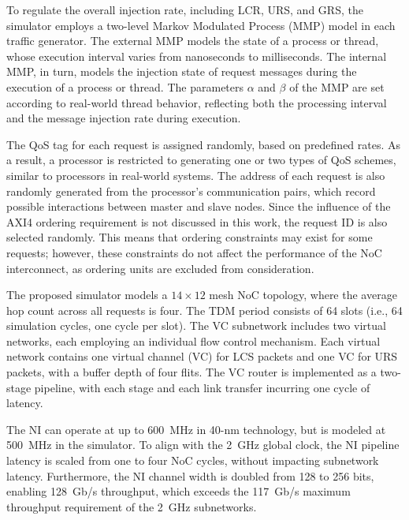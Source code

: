 To regulate the overall injection rate, including LCR, URS, and GRS, the simulator employs a two-level Markov Modulated Process (MMP) model in each traffic generator. The external MMP models the state of a process or thread, whose execution interval varies from nanoseconds to milliseconds. The internal MMP, in turn, models the injection state of request messages during the execution of a process or thread. The parameters $\alpha$ and $\beta$ of the MMP are set according to real-world thread behavior, reflecting both the processing interval and the message injection rate during execution. 

The QoS tag for each request is assigned randomly, based on predefined rates. As a result, a processor is restricted to generating one or two types of QoS schemes, similar to processors in real-world systems. 
The address of each request is also randomly generated from the processor’s communication pairs, which record possible interactions between master and slave nodes. 
Since the influence of the AXI4 ordering requirement is not discussed in this work, the request ID is also selected randomly. This means that ordering constraints may exist for some requests; however, these constraints do not affect the performance of the NoC interconnect, as ordering units are excluded from consideration.

The proposed simulator models a $14 \times 12$ mesh NoC topology, where the average hop count across all requests is four. The TDM period consists of 64 slots (i.e., 64 simulation cycles, one cycle per slot). The VC subnetwork includes two virtual networks, each employing an individual flow control mechanism. 
Each virtual network contains one virtual channel (VC) for LCS packets and one VC for URS packets, with a buffer depth of four flits. The VC router is implemented as a two-stage pipeline, with each stage and each link transfer incurring one cycle of latency. 

The NI can operate at up to 600~MHz in 40-nm technology, but is modeled at 500~MHz in the simulator. To align with the 2~GHz global clock, the NI pipeline latency is scaled from one to four NoC cycles, without impacting subnetwork latency. 
Furthermore, the NI channel width is doubled from 128 to 256 bits, enabling 128~Gb/s throughput, which exceeds the 117~Gb/s maximum throughput requirement of the 2~GHz subnetworks.
